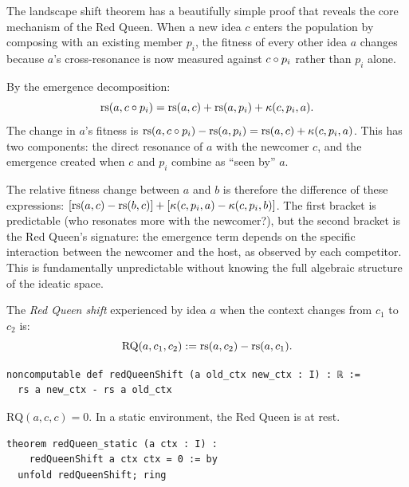 \begin{remark}
\label{rem:landscape-shift-intuition}
The landscape shift theorem has a beautifully simple proof that reveals the
core mechanism of the Red Queen.  When a new idea $c$ enters the population
by composing with an existing member $p_i$, the fitness of every other idea
$a$ changes because $a$'s cross-resonance is now measured against $c \circ
p_i$ rather than $p_i$ alone.

By the emergence decomposition:
\[
  \mathrm{rs}(a, c \circ p_i) = \mathrm{rs}(a, c) + \mathrm{rs}(a, p_i) + \kappa(c, p_i, a).
\]
The change in $a$'s fitness is $\mathrm{rs}(a, c \circ p_i) - \mathrm{rs}(a, p_i) =
\mathrm{rs}(a, c) + \kappa(c, p_i, a)$.  This has two components: the direct
resonance of $a$ with the newcomer $c$, and the emergence created when $c$
and $p_i$ combine as ``seen by'' $a$.

The relative fitness change between $a$ and $b$ is therefore the difference
of these expressions: $[\mathrm{rs}(a,c) - \mathrm{rs}(b,c)] + [\kappa(c, p_i, a) -
\kappa(c, p_i, b)]$.  The first bracket is predictable (who resonates more
with the newcomer?), but the second bracket is the Red Queen's signature:
the emergence term depends on the specific interaction between the newcomer
and the host, as observed by each competitor.  This is fundamentally
unpredictable without knowing the full algebraic structure of the ideatic
space.
\end{remark}

\begin{definition}
\label{def:red-queen-shift}
The \emph{Red Queen shift} experienced by idea $a$ when the context changes
from $c_1$ to $c_2$ is:
\[
  \text{RQ}(a, c_1, c_2) := \mathrm{rs}(a, c_2) - \mathrm{rs}(a, c_1).
\]

\begin{lstlisting}[caption={Lean 4: Red Queen shift}]
noncomputable def redQueenShift (a old_ctx new_ctx : I) : ℝ :=
  rs a new_ctx - rs a old_ctx
\end{lstlisting}
\end{definition}

\begin{theorem}
\label{thm:rq-stasis}
$\text{RQ}(a, c, c) = 0$.  In a static environment, the Red Queen is at rest.

\begin{lstlisting}[caption={Lean 4: Red Queen static}]
theorem redQueen_static (a ctx : I) :
    redQueenShift a ctx ctx = 0 := by
  unfold redQueenShift; ring
\end{lstlisting}
\end{theorem}

